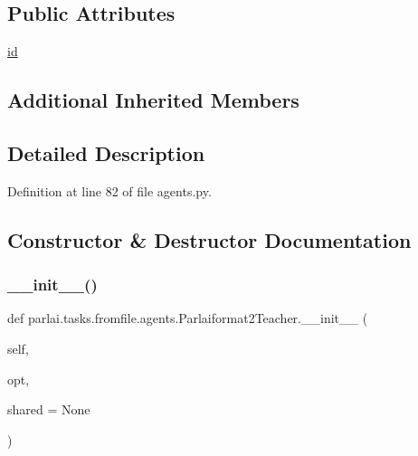 \subsection*{Public Attributes}
\begin{DoxyCompactItemize}
\item 
\hyperlink{classparlai_1_1tasks_1_1fromfile_1_1agents_1_1Parlaiformat2Teacher_aeea3091d7296c9abc5376a3b920a31b8}{id}
\end{DoxyCompactItemize}
\subsection*{Additional Inherited Members}


\subsection{Detailed Description}


Definition at line 82 of file agents.\+py.



\subsection{Constructor \& Destructor Documentation}
\mbox{\label{classparlai_1_1tasks_1_1fromfile_1_1agents_1_1Parlaiformat2Teacher_a18904cf2f5851ea2f1ee37136a0efb2b}} 
\subsubsection{\texorpdfstring{\+\_\+\+\_\+init\+\_\+\+\_\+()}{\_\_init\_\_()}}
{\footnotesize\ttfamily def parlai.\+tasks.\+fromfile.\+agents.\+Parlaiformat2\+Teacher.\+\_\+\+\_\+init\+\_\+\+\_\+ (\begin{DoxyParamCaption}\item[{}]{self,  }\item[{}]{opt,  }\item[{}]{shared = {\ttfamily None} }\end{DoxyParamCaption})}




